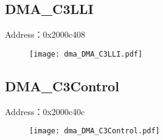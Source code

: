 \subsection{DMA\_C3LLI}
\label{dma-DMA-C3LLI}
Address：0x2000c408
 \begin{figure}[H]
\texttt{[image: dma\_DMA\_C3LLI.pdf]}
\end{figure}

\subsection{DMA\_C3Control}
\label{dma-DMA-C3Control}
Address：0x2000c40c
 \begin{figure}[H]
\texttt{[image: dma\_DMA\_C3Control.pdf]}
\end{figure}

